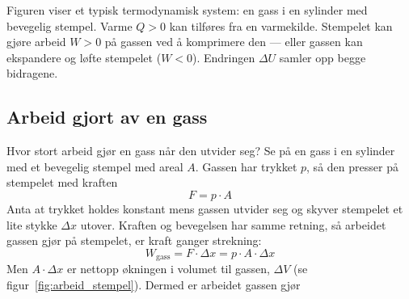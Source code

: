 \medskip

\noindent
\begin{minipage}[t]{0.54\linewidth}
\vspace{0pt}
Figuren viser et typisk termodynamisk system: en gass i en sylinder med bevegelig stempel. Varme $Q > 0$ kan tilføres fra en varmekilde. Stempelet kan gjøre arbeid $W > 0$ på gassen ved å komprimere den — eller gassen kan ekspandere og løfte stempelet ($W < 0$). Endringen $\Delta U$ samler opp begge bidragene.
\end{minipage}%
\hfill
\begin{minipage}[t]{0.42\linewidth}
\vspace{0pt}
\centering
{}
\label{fig:1lov_system}
\end{minipage}

\medskip

\subsection*{Arbeid gjort av en gass}

Hvor stort arbeid gjør en gass når den utvider seg? Se på en gass i en sylinder med et bevegelig stempel med areal $A$. Gassen har trykket $p$, så den presser på stempelet med kraften
\[
  F = p\cdot A
\]
Anta at trykket holdes konstant mens gassen utvider seg og skyver stempelet et lite stykke $\Delta x$ utover. Kraften og bevegelsen har samme retning, så arbeidet gassen gjør på stempelet, er kraft ganger strekning:
\[
  W_\text{gass} = F\cdot\Delta x = p\cdot A\cdot\Delta x
\]
Men $A\cdot\Delta x$ er nettopp økningen i volumet til gassen, $\Delta V$ (se figur~\ref{fig:arbeid_stempel}). Dermed er arbeidet gassen gjør

